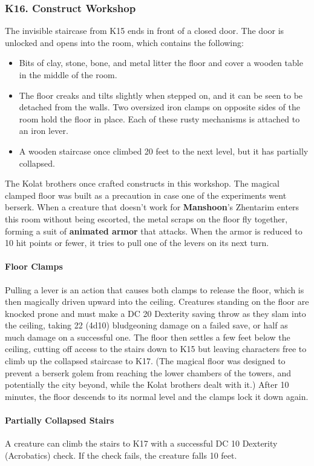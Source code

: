 \documentclass[10pt,a4paper,twoside,twocolumn,openany,nodeprecatedcode]{dndbook}
\begin{document}
\subsubsection{K16. Construct Workshop}
The invisible staircase from K15 ends in front of a closed door. The door is unlocked and opens into the room, which contains the following:
\begin{itemize}

\item Bits of clay, stone, bone, and metal litter the floor and cover a wooden table in the middle of the room.
\item The floor creaks and tilts slightly when stepped on, and it can be seen to be detached from the walls. Two oversized iron clamps on opposite sides of the room hold the floor in place. Each of these rusty mechanisms is attached to an iron lever.
\item A wooden staircase once climbed 20 feet to the next level, but it has partially collapsed.
\end{itemize}


The Kolat brothers once crafted constructs in this workshop. The magical clamped floor was built as a precaution in case one of the experiments went berserk.
When a creature that doesn't work for \textbf{Manshoon}'s Zhentarim enters this room without being escorted, the metal scraps on the floor fly together, forming a suit of \textbf{animated armor} that attacks. When the armor is reduced to 10 hit points or fewer, it tries to pull one of the levers on its next turn.
\paragraph{Floor Clamps}
Pulling a lever is an action that causes both clamps to release the floor, which is then magically driven upward into the ceiling. Creatures standing on the floor are knocked prone and must make a DC 20 Dexterity saving throw as they slam into the ceiling, taking 22 (4d10) bludgeoning damage on a failed save, or half as much damage on a successful one. The floor then settles a few feet below the ceiling, cutting off access to the stairs down to K15 but leaving characters free to climb up the collapsed staircase to K17. (The magical floor was designed to prevent a berserk golem from reaching the lower chambers of the towers, and potentially the city beyond, while the Kolat brothers dealt with it.) After 10 minutes, the floor descends to its normal level and the clamps lock it down again.
\paragraph{Partially Collapsed Stairs}
A creature can climb the stairs to K17 with a successful DC 10 Dexterity (Acrobatics) check. If the check fails, the creature falls 10 feet.
\end{document}
